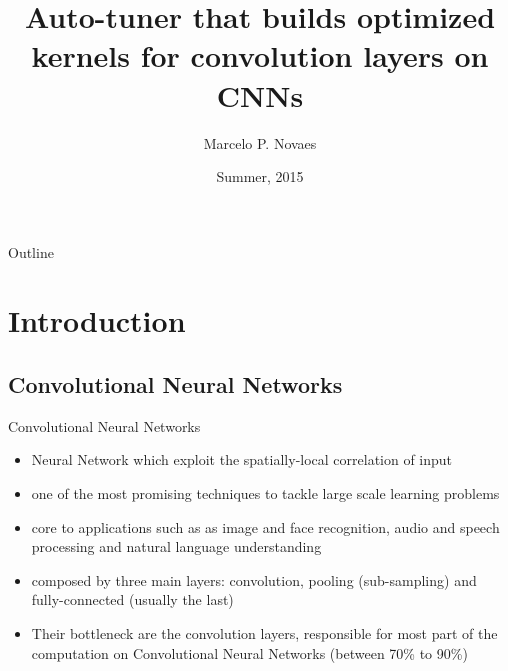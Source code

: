 \documentclass{beamer}
\title{Auto-tuner that builds optimized kernels for convolution layers on CNNs}
\author{Marcelo P. Novaes\inst{1}\inst{2}}
\institute[Stanford University] %
{
  \inst{1}%
  Pervasive Parallelism Laboratory\\
  Stanford University
  \and
  \inst{2}%
  Department of Computer Science\\
  Universidade Federal da Bahia (UFBA)
}
\date{Summer, 2015}
\begin{document}
\begin{frame}
  \titlepage
\end{frame}

\begin{frame}{Outline}
  \tableofcontents
\end{frame}

\section{Introduction}

\subsection{Convolutional Neural Networks}

\begin{frame}{Convolutional Neural Networks}
\begin{itemize}
  \item {
Neural Network which exploit the spatially-local correlation of input
  }
  \item {
  one of the most promising techniques to tackle large scale learning problems
  }
  \item {
    core to applications such as as image and face recognition, audio and speech processing and natural language understanding
  }
  \item {
  composed by three main layers: convolution, pooling (sub-sampling) and fully-connected (usually the last)
  }
  \item {
   Their bottleneck are the convolution layers, responsible for most part of the computation on Convolutional Neural Networks (between 70\% to 90\%)
  }
  \end{itemize}
\end{frame}
\end{document}
